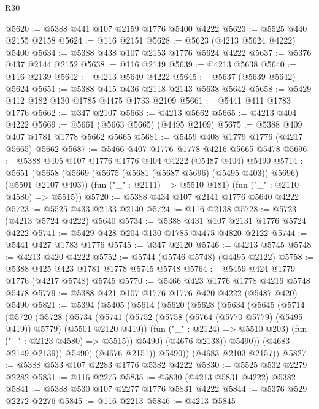 \begin{lexlean}{R30}
\begin{coremodule}
@5620 := @5388 @441 @107 @2159 @1776 @5400 @4222
@5623 := @5525 @440 @2155 @2158
@5624 := @116 @2151
@5628 := @5623 (@4213 @5624 @4222) @5400
@5634 := @5388 @438 @107 @2153 @1776 @5624 @4222
@5637 := @5376 @437 @2144 @2152
@5638 := @116 @2149
@5639 := @4213 @5638
@5640 := @116 @2139
@5642 := @4213 @5640 @4222
@5645 := @5637 (@5639 @5642) @5624
@5651 := @5388 @415 @436 @2118 @2143 @5638 @5642
@5658 := @5429 @412 @182 @130 @1785 @4475 @4733 @2109
@5661 := @5441 @411 @1783 @1776
@5662 := @347 @2107
@5663 := @4213 @5662
@5665 := @4213 @404 @4222
@5669 := @5661 (@5663 @5665) (@4495 @2109)
@5675 := @5388 @409 @407 @1781 @1778 @5662 @5665
@5681 := @5459 @408 @1779 @1776 (@4217 @5665) @5662
@5687 := @5466 @407 @1776 @1778 @4216 @5665 @5478
@5696 := @5388 @405 @107 @1776 @1776 @404 @4222 (@5487 @404) @5490
@5714 := @5651
    (@5658
      (@5669 (@5675 (@5681 (@5687 @5696) (@5495 @403)) @5696) (@5501 @2107 @403))
      (fun ("_" : @2111) => @5510 @181)
      (fun ("_" : @2110 @4580) => @5515))
@5720 := @5388 @434 @107 @2141 @1776 @5640 @4222
@5723 := @5525 @433 @2133 @2140
@5724 := @116 @2138
@5728 := @5723 (@4213 @5724 @4222) @5640
@5734 := @5388 @431 @107 @2131 @1776 @5724 @4222
@5741 := @5429 @428 @204 @130 @1785 @4475 @4820 @2122
@5744 := @5441 @427 @1783 @1776
@5745 := @347 @2120
@5746 := @4213 @5745
@5748 := @4213 @420 @4222
@5752 := @5744 (@5746 @5748) (@4495 @2122)
@5758 := @5388 @425 @423 @1781 @1778 @5745 @5748
@5764 := @5459 @424 @1779 @1776 (@4217 @5748) @5745
@5770 := @5466 @423 @1776 @1778 @4216 @5748 @5478
@5779 := @5388 @421 @107 @1776 @1776 @420 @4222 (@5487 @420) @5490
@5821 := @5394
    (@5405
      (@5614
        (@5620
          (@5628
            (@5634
              (@5645
                (@5714
                  (@5720
                    (@5728
                      (@5734
                        (@5741
                          (@5752
                            (@5758 (@5764 (@5770 @5779) (@5495 @419)) @5779)
                            (@5501 @2120 @419))
                          (fun ("_" : @2124) => @5510 @203)
                          (fun ("_" : @2123 @4580) => @5515))
                        @5490)
                      (@4676 @2138))
                    @5490))
                (@4683 @2149 @2139))
              @5490)
            (@4676 @2151))
          @5490))
      (@4683 @2103 @2157))
@5827 := @5388 @533 @107 @2283 @1776 @5382 @4222
@5830 := @5525 @532 @2279 @2282
@5831 := @116 @2275
@5835 := @5830 (@4213 @5831 @4222) @5382
@5841 := @5388 @530 @107 @2277 @1776 @5831 @4222
@5844 := @5376 @529 @2272 @2276
@5845 := @116 @2213
@5846 := @4213 @5845

\end{coremodule}
\end{lexlean}
